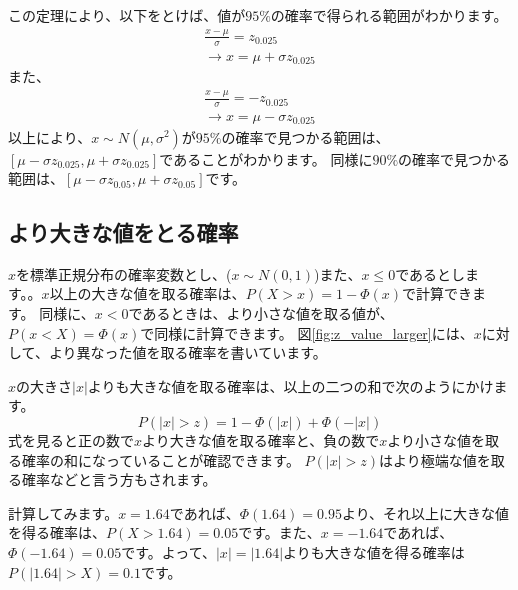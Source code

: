 この定理により、以下をとけば、値が$95\%$の確率で得られる範囲がわかります。
\begin{eqnarray*}
    \frac{x-\mu}{\sigma}=z_{0.025}\\
    \rightarrow x = \mu+\sigma z_{0.025}
\end{eqnarray*}
また、
\begin{eqnarray*}
    \frac{x-\mu}{\sigma}=-z_{0.025}\\
    \rightarrow x = \mu-\sigma z_{0.025}
\end{eqnarray*}
以上により、$x \sim N(\mu,\sigma^2)$が$95\%$の確率で見つかる範囲は、$[\mu-\sigma z_{0.025},\mu+\sigma z_{0.025}]$であることがわかります。
同様に$90\%$の確率で見つかる範囲は、$[\mu-\sigma z_{0.05},\mu+\sigma z_{0.05}]$です。

\subsection{より大きな値をとる確率}
$x$を標準正規分布の確率変数とし、($x\sim N(0,1)$)また、$x\leq 0$であるとします。。$x$以上の大きな値を取る確率は、$P(X>x)=1-\varPhi(x)$で計算できます。
同様に、$x < 0$であるときは、より小さな値を取る値が、$P(x<X)=\varPhi(x)$で同様に計算できます。
図\ref{fig:z_value_larger}には、$x$に対して、より異なった値を取る確率を書いています。

$x$の大きさ$|x|$よりも大きな値を取る確率は、以上の二つの和で次のようにかけます。
\begin{equation}
    P(|x|>z) = 1-\varPhi(|x|)+\varPhi(-|x|)
\end{equation}
式を見ると正の数で$x$より大きな値を取る確率と、負の数で$x$より小さな値を取る確率の和になっていることが確認できます。
$P(|x|>z)$はより極端な値を取る確率などと言う方もされます。

計算してみます。$x=1.64$であれば、$\varPhi(1.64)=0.95$より、それ以上に大きな値を得る確率は、$P(X>1.64)=0.05$です。また、$x=-1.64$であれば、$\varPhi(-1.64)=0.05$です。よって、$|x|=|1.64|$よりも大きな値を得る確率は$P(|1.64|>X)=0.1$です。


